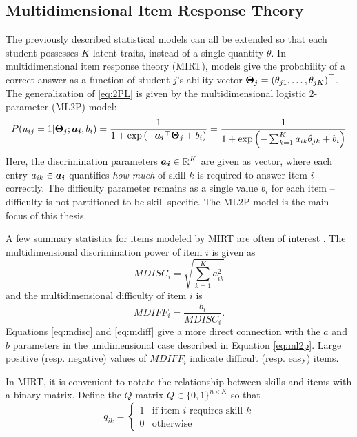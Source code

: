 \subsection{Multidimensional Item Response Theory}\label{sec:mirt}
The previously described statistical models can all be extended so that each student possesses $K$ latent traits, instead of a single quantity $\theta$. In multidimensional item response theory (MIRT), models give the probability of a correct answer as a function of student $j$'s ability vector $\boldsymbol{\Theta}_j = (\theta_{j1},\ldots, \theta_{jK})^\top$. The generalization of \ref{eq:2PL} is given by the multidimensional logistic 2-parameter (ML2P) model:
\begin{equation}
P(u_{ij} = 1 | \boldsymbol{\Theta}_j; \boldsymbol{a_i}, b_i) = \frac{1}{1 + \exp\left(-\boldsymbol{a_i}^\top \boldsymbol{\Theta}_j + b_i\right)} = \frac{1}{1 + \exp\left(-\sum_{k=1}^K a_{ik} \theta_{jk} + b_i \right)}
  \label{eq:ml2p}
\end{equation}
Here, the discrimination parameters $\boldsymbol{a_i} \in \mathbb{R}^K$ are given as vector, where each entry $a_{ik} \in \boldsymbol{a_i}$ quantifies \textit{how much} of skill $k$ is required to answer item $i$ correctly. The difficulty parameter remains as a single value $b_i$ for each item -- difficulty is not partitioned to be skill-specific. The ML2P model is the main focus of this thesis.

A few summary statistics for items modeled by MIRT are often of interest \cite{reckase2009multidimensional}. The multidimensional discrimination power of item $i$ is given as
\begin{equation}
  MDISC_i = \sqrt{\sum_{k=1}^K a_{ik}^2}
  \label{eq:mdisc}
\end{equation}
and the multidimensional difficulty of item $i$ is
\begin{equation}
  MDIFF_i = \frac{b_i}{MDISC_i}.
  \label{eq:mdiff}
\end{equation}
Equations \ref{eq:mdisc} and \ref{eq:mdiff} give a more direct connection with the $a$ and $b$ parameters in the unidimensional case described in Equation \ref{eq:ml2p}. Large positive (resp. negative) values of $MDIFF_i$ indicate difficult (resp. easy) items.

In MIRT, it is convenient to notate the relationship between skills and items with a binary matrix. Define the $Q$-matrix \cite{tatsuoka1983} $Q \in \{0,1\}^{n\times K}$ so that 
\begin{equation}
  q_{ik} = \begin{cases}
    1 & \text{if item } i \text{ requires skill } k\\
    0 & \text{otherwise}
  \end{cases}
  \label{eq:q_matrix}
\end{equation}

